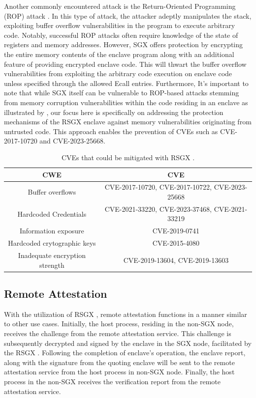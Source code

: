 \documentclass[article, doublespace,nopageskip]{VTthesis} %
\newcommand{\monitor}{RSGX \xspace}
\begin{document}
    Another commonly encountered attack is the Return-Oriented Programming (ROP) attack \cite{Remote-procedure-call}. In this type of attack, the attacker adeptly manipulates the stack, exploiting buffer overflow vulnerabilities in the program to execute arbitrary code. Notably, successful ROP attacks often require knowledge of the state of registers and memory addresses. However, SGX offers protection by encrypting the entire memory contents of the enclave program along with an additional feature of providing encrypted enclave code. This will thwart the buffer overflow vulnerabilities from exploiting the arbitrary code execution on enclave code unless specified through the allowed Ecall entries. Furthermore, It's important to note that while SGX itself can be vulnerable to ROP-based attacks stemming from memory corruption vulnerabilities within the code residing in an enclave as illustrated by \cite{ROP-paper}, our focus here is specifically on addressing the protection mechanisms of the \monitor enclave against memory vulnerabilities originating from untrusted code. This approach enables the prevention of CVEs such as CVE-2017-10720 and CVE-2023-25668.

    \begin{table}[t]
    \centering
    \footnotesize
    \caption{CVEs that could be mitigated with \monitor.}
    \begin{tabular}{| c | c |} \hline
          CWE & CVE \\ \hline \hline
        Buffer overflows & CVE-2017-10720, CVE-2017-10722, CVE-2023-25668\\ \hline  
        Hardcoded Credentials & CVE-2021-33220, CVE-2023-37468, CVE-2021-33219\\ \hline
        Information exposure & CVE-2019-0741 \\ \hline
        Hardcoded crytographic keys & CVE-2015-4080 \\ \hline
        Inadequate encryption strength & CVE-2019-13604, CVE-2019-13603 \\ \hline
    \end{tabular}
    \label{t:CVEs}
    \end{table}

    \subsection{Remote Attestation} \label{remote attestation}
    With the utilization of \monitor, remote attestation functions in a manner similar to other use cases. Initially, the host process, residing in the non-SGX node, receives the challenge from the remote attestation service. This challenge is subsequently decrypted and signed by the enclave in the SGX node, facilitated by the \monitor. Following the completion of enclave’s operation, the enclave report, along with the signature from the quoting enclave will be sent to the remote attestation service from the host process in non-SGX node. Finally, the host process in the non-SGX receives the verification report from the remote attestation service.
\end{document}
